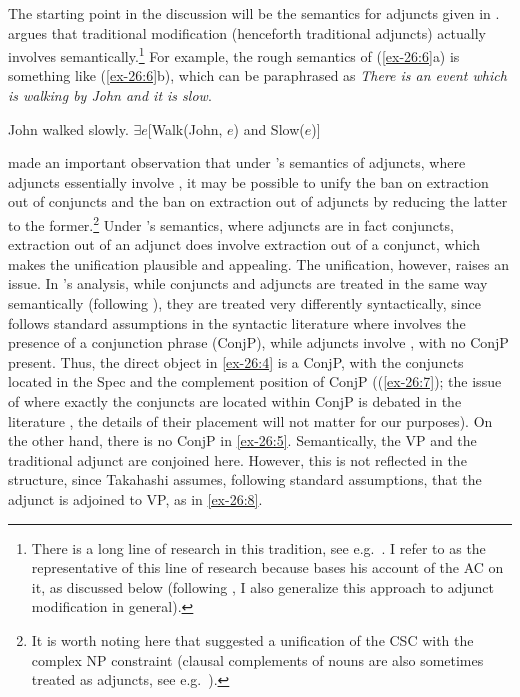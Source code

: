 \documentclass[output=paper]{langsci/langscibook}
\begin{document}
The starting point in the discussion will be the semantics for adjuncts given
in \citet{Higginbotham1985}. \citeauthor{Higginbotham1985} argues that
traditional  modification (henceforth traditional adjuncts) actually
involves  semantically.\footnote{There is a long line of research
    in this tradition, see e.g.\
    \citet{Davidson1967,Parsons1980,Parsons1990,Dowty1989,%
    Takahashi1994,Progovac1998,Progovac1999,Hunter2011}. I refer to
    \citet{Higginbotham1985} as the representative of this line of research
because \citet{Takahashi1994} bases his account of the \glsdesc{AC} on it, as
discussed below (following \citeauthor{Takahashi1994}, I also generalize this
approach to adjunct modification in general).} For example, the rough semantics
of (\ref{ex-26:6}a) is something like (\ref{ex-26:6}b), which can be paraphrased as \emph{There is an
event which is walking by John and it is slow}.

\ea\label{ex-26:6}
	\ea John walked slowly.
    \ex $\exists e$[Walk(John, $e$) and Slow($e$)]
	\z
\z

\citet{Takahashi1994} made an important observation that under
\citeauthor{Higginbotham1985}’s semantics of adjuncts, where adjuncts
essentially involve \isi{coordination}, it may be possible to unify the ban on
extraction out of conjuncts and the ban on extraction out of adjuncts by
reducing the latter to the former.\footnote{It is worth noting here that
    \citet{Ross1974} suggested a unification of the \gls{CSC} with the complex
    NP constraint (clausal complements of nouns are also sometimes treated as
adjuncts, see e.g.\ \citealt{Stowell1981,Takahashi1994}).} Under
\citeauthor{Higginbotham1985}’s semantics, where adjuncts are in fact
conjuncts, extraction out of an adjunct does involve extraction out of a
conjunct, which makes the unification plausible and appealing. The unification,
however, raises an issue. In \citeauthor{Takahashi1994}’s analysis, while
conjuncts and adjuncts\is{adjunction} are treated in the same way semantically (following
\citeauthor{Higginbotham1985}), they are treated very differently
syntactically, since \citeauthor{Takahashi1994} follows standard assumptions in
the syntactic literature where \isi{coordination} involves the presence of a
conjunction phrase (ConjP), while adjuncts\is{adjunction} involve , with no ConjP
present. Thus, the direct object in \eqref{ex-26:4} is a ConjP, with the conjuncts located
in the Spec and the complement position of ConjP ((\ref{ex-26:7}); the issue of where
exactly the conjuncts are located within ConjP is debated in the literature
\parencite[see e.g.][]{Munn1993,Progovac1999}, the details of their placement
will not matter for our purposes). On the other hand, there is no ConjP in \eqref{ex-26:5}.
Semantically, the VP and the traditional adjunct are conjoined here.  However,
this is not reflected in the structure, since Takahashi assumes, following
standard assumptions, that the adjunct is adjoined\is{adjunction} to VP, as in \eqref{ex-26:8}.
\end{document}

